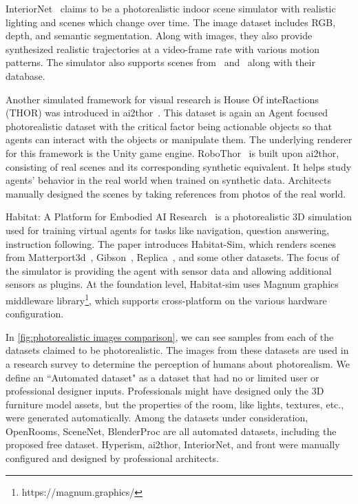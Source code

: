 InteriorNet~\cite{InteriorNet18} claims to be a photorealistic indoor scene simulator with realistic lighting and scenes which change over time.
The image dataset includes RGB, depth, and semantic segmentation.
Along with images, they also provide synthesized realistic trajectories at a video-frame rate with various motion patterns.
The simulator also supports scenes from~\cite{McCormac2017} and~\cite{Song2017SemanticSC} along with their database.

Another simulated framework for visual research is House Of inteRactions (THOR) was introduced in \gls{ai2thor}~\cite{ai2thor}.
This dataset is again an Agent focused photorealistic dataset with the critical factor being actionable objects so that agents can interact with the objects or manipulate them.
The underlying renderer for this framework is the Unity game engine.
RoboThor~\cite{robothor} is built upon \gls{ai2thor}, consisting of real scenes and its corresponding synthetic equivalent.
It helps study agents' behavior in the real world when trained on synthetic data.
Architects manually designed the scenes by taking references from photos of the real world.

Habitat: A Platform for Embodied AI Research~\cite{Savva2019} is a photorealistic 3D simulation used for training virtual agents for tasks like navigation, question answering, instruction following.
The paper introduces Habitat-Sim, which renders scenes from Matterport3d~\cite{Chang2018}, Gibson~\cite{Xia2018}, Replica~\cite{Straub2019TheRD}, and some other datasets.
The focus of the simulator is providing the agent with sensor data and allowing additional sensors as plugins.
At the foundation level, Habitat-sim uses Magnum graphics
middleware library\footnote{https://magnum.graphics/}, which supports cross-platform on the various hardware configuration.

In \autoref{fig:photorealistic images comparison}, we can see samples from each of the datasets claimed to be photorealistic.
The images from these datasets are used in a research survey to determine the perception of humans about photorealism.
We define an ``Automated dataset" as a dataset that had no or limited user or professional designer inputs.
Professionals might have designed only the 3D furniture model assets, but the properties of the room, like lights, textures, etc., were generated automatically.
Among the datasets under consideration,
OpenRooms, SceneNet, BlenderProc are all automated datasets, including the proposed \gls{free} dataset.
Hyperism, \gls{ai2thor}, InteriorNet, and \gls{front} were manually configured and designed by professional architects.


